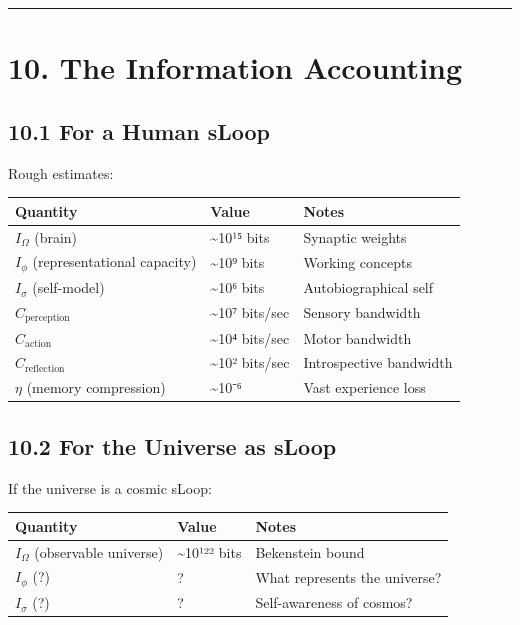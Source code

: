 \documentclass[
  11pt,
  letterpaper,
  twoside,
  openright]{book}
\begin{document}
\begin{center}\rule{0.5\linewidth}{0.5pt}\end{center}

\section{10. The Information
Accounting}\label{the-information-accounting}

\subsection{10.1 For a Human sLoop}\label{for-a-human-sloop}

Rough estimates:

\begin{longtable}[]{@{}lll@{}}
\toprule\noalign{}
Quantity & Value & Notes \\
\midrule\noalign{}
\endhead
\bottomrule\noalign{}
\endlastfoot
\(I_\Omega\) (brain) & \textasciitilde10¹⁵ bits & Synaptic weights \\
\(I_\phi\) (representational capacity) & \textasciitilde10⁹ bits &
Working concepts \\
\(I_\sigma\) (self-model) & \textasciitilde10⁶ bits & Autobiographical
self \\
\(C_{\text{perception}}\) & \textasciitilde10⁷ bits/sec & Sensory
bandwidth \\
\(C_{\text{action}}\) & \textasciitilde10⁴ bits/sec & Motor bandwidth \\
\(C_{\text{reflection}}\) & \textasciitilde10² bits/sec & Introspective
bandwidth \\
\(\eta\) (memory compression) & \textasciitilde10⁻⁶ & Vast experience
loss \\
\end{longtable}

\subsection{10.2 For the Universe as
sLoop}\label{for-the-universe-as-sloop}

If the universe is a cosmic sLoop:

\begin{longtable}[]{@{}lll@{}}
\toprule\noalign{}
Quantity & Value & Notes \\
\midrule\noalign{}
\endhead
\bottomrule\noalign{}
\endlastfoot
\(I_\Omega\) (observable universe) & \textasciitilde10¹²² bits &
Bekenstein bound \\
\(I_\phi\) (?) & ? & What represents the universe? \\
\(I_\sigma\) (?) & ? & Self-awareness of cosmos? \\
\end{longtable}
\end{document}
